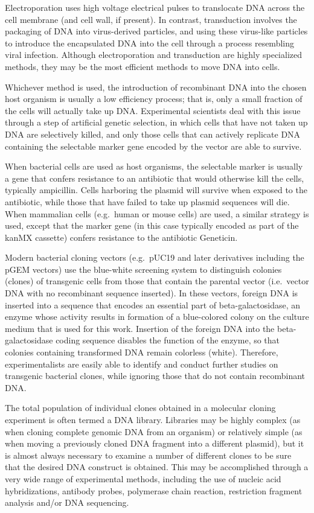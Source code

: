 Electroporation uses high voltage electrical pulses to translocate DNA across the cell membrane (and cell wall, if present). In contrast, transduction involves the packaging of DNA into virus-derived particles, and using these virus-like particles to introduce the encapsulated DNA into the cell through a process resembling viral infection. Although electroporation and transduction are highly specialized methods, they may be the most efficient methods to move DNA into cells.

Whichever method is used, the introduction of recombinant DNA into the chosen host organism is usually a low efficiency process; that is, only a small fraction of the cells will actually take up DNA. Experimental scientists deal with this issue through a step of artificial genetic selection, in which cells that have not taken up DNA are selectively killed, and only those cells that can actively replicate DNA containing the selectable marker gene encoded by the vector are able to survive.

When bacterial cells are used as host organisms, the selectable marker is usually a gene that confers resistance to an antibiotic that would otherwise kill the cells, typically ampicillin. Cells harboring the plasmid will survive when exposed to the antibiotic, while those that have failed to take up plasmid sequences will die. When mammalian cells (e.g.~human or mouse cells) are used, a similar strategy is used, except that the marker gene (in this case typically encoded as part of the kanMX cassette) confers resistance to the antibiotic Geneticin.

Modern bacterial cloning vectors (e.g.~pUC19 and later derivatives including the pGEM vectors) use the blue-white screening system to distinguish colonies (clones) of transgenic cells from those that contain the parental vector (i.e.~vector DNA with no recombinant sequence inserted). In these vectors, foreign DNA is inserted into a sequence that encodes an essential part of beta-galactosidase, an enzyme whose activity results in formation of a blue-colored colony on the culture medium that is used for this work. Insertion of the foreign DNA into the beta-galactosidase coding sequence disables the function of the enzyme, so that colonies containing transformed DNA remain colorless (white). Therefore, experimentalists are easily able to identify and conduct further studies on transgenic bacterial clones, while ignoring those that do not contain recombinant DNA.

The total population of individual clones obtained in a molecular cloning experiment is often termed a DNA library. Libraries may be highly complex (as when cloning complete genomic DNA from an organism) or relatively simple (as when moving a previously cloned DNA fragment into a different plasmid), but it is almost always necessary to examine a number of different clones to be sure that the desired DNA construct is obtained. This may be accomplished through a very wide range of experimental methods, including the use of nucleic acid hybridizations, antibody probes, polymerase chain reaction, restriction fragment analysis and/or DNA sequencing.

